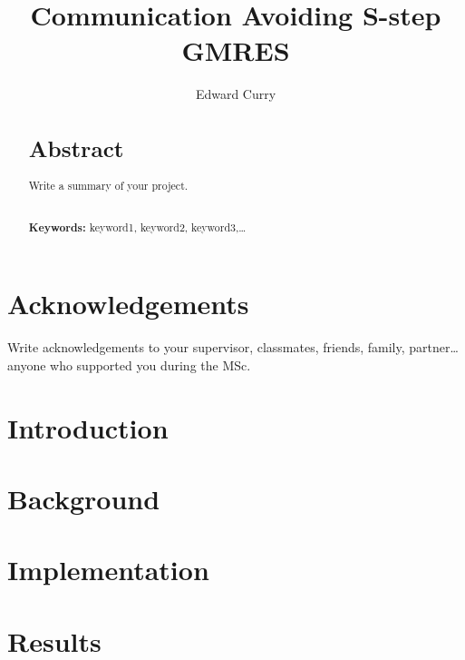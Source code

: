 \documentclass[nochapter]{tcd-msc-hpc}
\title{Communication Avoiding S-step GMRES}
\author{Edward Curry}
\begin{document}
\maketitle

\newpage

\makeplagiarismpage

\newpage

\section*{Acknowledgements}
Write acknowledgements to your supervisor, classmates, friends, family, partner\ldots anyone who supported you during the MSc.

\lipsum[2-4]

\newpage
\begin{abstract}
\section*{Abstract}
Write a summary of your project.

\lipsum[2-4]
\\
\newline
\textbf{Keywords:} keyword1, keyword2, keyword3,\ldots
\end{abstract}
\vspace{8pt}
\tableofcontents
\newpage
\section{Introduction}\label{sec:intro}



\newpage
\section{Background}\label{sec:background}



\newpage
\section{Implementation}\label{sec:implementation}



\newpage
\section{Results}\label{sec:results}

\end{document}
